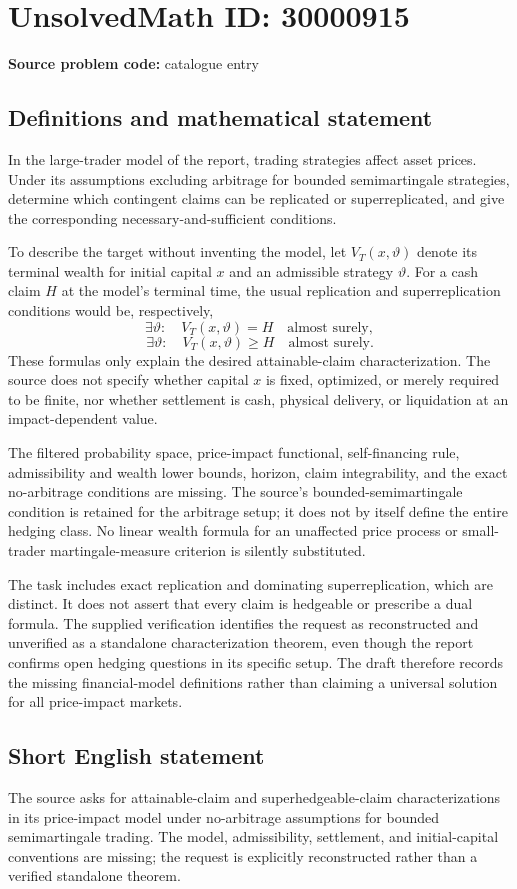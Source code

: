 \documentclass[11pt]{article}
\begin{document}
\section*{UnsolvedMath ID: 30000915}
\textbf{Source problem code:} catalogue entry
\subsection{Definitions and mathematical statement}
In the large-trader model of the report, trading strategies affect asset prices. Under its assumptions excluding arbitrage for bounded semimartingale strategies, determine which contingent claims can be replicated or superreplicated, and give the corresponding necessary-and-sufficient conditions.

To describe the target without inventing the model, let $V_T(x,\vartheta)$ denote its terminal wealth for initial capital $x$ and an admissible strategy $\vartheta$. For a cash claim $H$ at the model's terminal time, the usual replication and superreplication conditions would be, respectively,
\[
 \exists\vartheta:\quad V_T(x,\vartheta)=H\quad\text{almost surely},
\]
\[
 \exists\vartheta:\quad V_T(x,\vartheta)\ge H\quad\text{almost surely}.
\]
These formulas only explain the desired attainable-claim characterization. The source does not specify whether capital $x$ is fixed, optimized, or merely required to be finite, nor whether settlement is cash, physical delivery, or liquidation at an impact-dependent value.

The filtered probability space, price-impact functional, self-financing rule, admissibility and wealth lower bounds, horizon, claim integrability, and the exact no-arbitrage conditions are missing. The source's bounded-semimartingale condition is retained for the arbitrage setup; it does not by itself define the entire hedging class. No linear wealth formula for an unaffected price process or small-trader martingale-measure criterion is silently substituted.

The task includes exact replication and dominating superreplication, which are distinct. It does not assert that every claim is hedgeable or prescribe a dual formula. The supplied verification identifies the request as reconstructed and unverified as a standalone characterization theorem, even though the report confirms open hedging questions in its specific setup. The draft therefore records the missing financial-model definitions rather than claiming a universal solution for all price-impact markets.
\subsection{Short English statement}
The source asks for attainable-claim and superhedgeable-claim characterizations in its price-impact model under no-arbitrage assumptions for bounded semimartingale trading. The model, admissibility, settlement, and initial-capital conventions are missing; the request is explicitly reconstructed rather than a verified standalone theorem.
\end{document}
